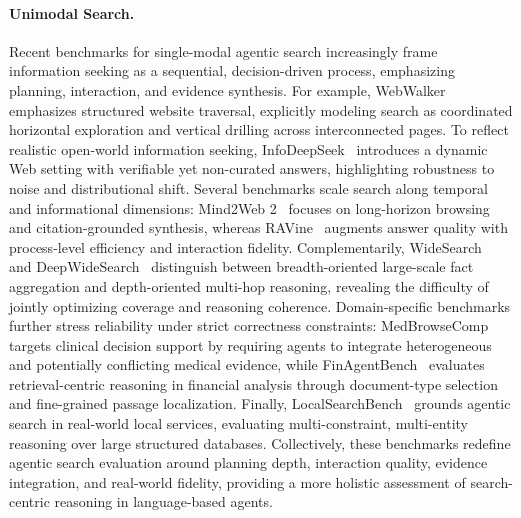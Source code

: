 \paragraph{Unimodal Search.} Recent benchmarks for single-modal agentic search increasingly frame information seeking as a sequential, decision-driven process, emphasizing planning, interaction, and evidence synthesis. For example, WebWalker~\cite{wu2025webwalker} emphasizes structured website traversal, explicitly modeling search as coordinated horizontal exploration and vertical drilling across interconnected pages. To reflect realistic open-world information seeking, InfoDeepSeek~\cite{xi2025infodeepseek} introduces a dynamic Web setting with verifiable yet non-curated answers, highlighting robustness to noise and distributional shift. Several benchmarks scale search along temporal and informational dimensions: Mind2Web 2~\cite{gou2025mind2web2} focuses on long-horizon browsing and citation-grounded synthesis, whereas RAVine~\cite{xu2025ravine} augments answer quality with process-level efficiency and interaction fidelity. Complementarily, WideSearch~\cite{wong2025widesearch} and DeepWideSearch~\cite{lan2025deepwidesearch} distinguish between breadth-oriented large-scale fact aggregation and depth-oriented multi-hop reasoning, revealing the difficulty of jointly optimizing coverage and reasoning coherence. Domain-specific benchmarks further stress reliability under strict correctness constraints: MedBrowseComp~\cite{chen2025medbrowsecomp} targets clinical decision support by requiring agents to integrate heterogeneous and potentially conflicting medical evidence, while FinAgentBench~\cite{choi2025finagentbench} evaluates retrieval-centric reasoning in financial analysis through document-type selection and fine-grained passage localization. Finally, LocalSearchBench~\cite{he2025localsearchbench} grounds agentic search in real-world local services, evaluating multi-constraint, multi-entity reasoning over large structured databases. Collectively, these benchmarks redefine agentic search evaluation around planning depth, interaction quality, evidence integration, and real-world fidelity, providing a more holistic assessment of search-centric reasoning in language-based agents.


